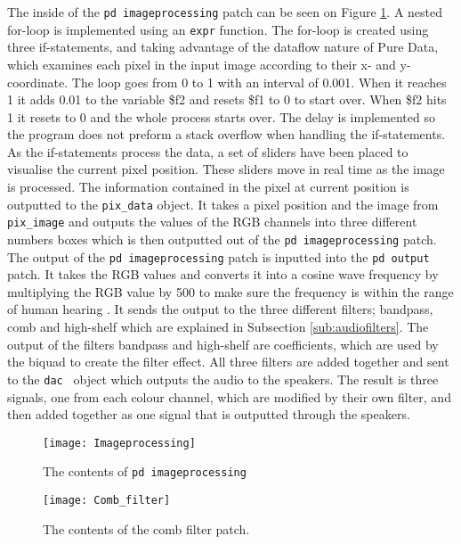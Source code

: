 The inside of the \texttt{pd imageprocessing} patch can be seen on Figure \ref{Fig:Imageprocessing}. A nested for-loop is implemented using an \texttt{expr} function. The for-loop is created using three if-statements, and taking advantage of the dataflow nature of Pure Data, which examines each pixel in the input image according to their x- and y-coordinate.
The loop goes from 0 to 1 with an interval of 0.001. When it reaches 1 it adds 0.01 to the variable \$f2 and resets \$f1 to 0 to start over. When \$f2 hits 1 it resets to 0 and the whole process starts over. The delay is implemented so the program does not preform a stack overflow when handling the if-statements. 
As the if-statements process the data, a set of sliders have been placed to visualise the current pixel position. These sliders move in real time as the image is processed. The information contained in the pixel at current position is outputted to the \texttt{pix\_data} object. It takes a pixel position and the image from \texttt{pix\_image} and outputs the values of the RGB channels into three different numbers boxes which is then outputted out of the \texttt{pd imageprocessing} patch. The output of the \texttt{pd imageprocessing} patch is inputted into the \texttt{pd output} patch. It takes the RGB values and converts it into a cosine wave frequency by multiplying the RGB value by 500 to make sure the frequency is within the range of human hearing \cite{steiglitz1997digital}. It sends the output to the three different filters; bandpass, comb and high-shelf which are explained in Subsection \ref{sub:audiofilters}. The output of the filters bandpass and high-shelf are coefficients, which are used by the biquad to create the filter effect. All three filters are added together and sent to the \texttt{dac~} object which outputs the audio to the speakers. The result is three signals, one from each colour channel, which are modified by their own filter, and then added together as one signal that is outputted through the speakers. 

\begin{figure}
\centering
\texttt{[image: Imageprocessing]}
\caption{The contents of \texttt{pd imageprocessing}}
\label{Fig:Imageprocessing}
\end{figure}

\begin{figure}
\centering
\texttt{[image: Comb\_filter]}
\caption{The contents of the comb filter patch.}
\label{Fig:Comb_filter}
\end{figure}


